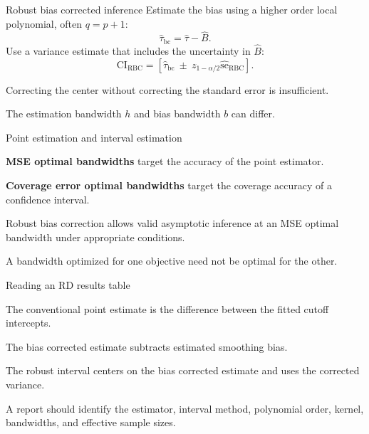\begin{frame}{Robust bias corrected inference}
Estimate the bias using a higher order local polynomial, often $q=p+1$:
\[
\widehat\tau_{\mathrm{bc}}=\widehat\tau-\widehat B.
\]
Use a variance estimate that includes the uncertainty in $\widehat B$:
\[
\mathrm{CI}_{\mathrm{RBC}}=
\left[\widehat\tau_{\mathrm{bc}}\ \pm\ z_{1-\alpha/2}\widehat{\mathrm{se}}_{\mathrm{RBC}}\right].
\]
\begin{items}
\item Correcting the center without correcting the standard error is insufficient.
\item The estimation bandwidth $h$ and bias bandwidth $b$ can differ.
\end{items}
\end{frame}

\begin{frame}{Point estimation and interval estimation}
\begin{items}
\item \textbf{MSE optimal bandwidths} target the accuracy of the point estimator.
\item \textbf{Coverage error optimal bandwidths} target the coverage accuracy of a confidence interval.
\item Robust bias correction allows valid asymptotic inference at an MSE optimal bandwidth under appropriate conditions.
\item A bandwidth optimized for one objective need not be optimal for the other.
\end{items}
\end{frame}

\begin{frame}{Reading an RD results table}
\begin{items}
\item The conventional point estimate is the difference between the fitted cutoff intercepts.
\item The bias corrected estimate subtracts estimated smoothing bias.
\item The robust interval centers on the bias corrected estimate and uses the corrected variance.
\item A report should identify the estimator, interval method, polynomial order, kernel, bandwidths, and effective sample sizes.
\end{items}
\end{frame}

